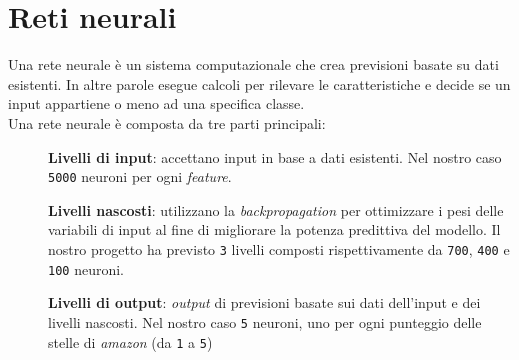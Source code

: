 				
		\section{Reti neurali}
			Una rete neurale è un sistema computazionale che crea previsioni basate su dati esistenti. In altre parole esegue calcoli per rilevare le caratteristiche e decide se un input appartiene o meno ad una specifica classe.\\			
			Una rete neurale è composta da tre parti principali:
			\begin{description}
				\item[] \textbf{Livelli di input}: accettano input in base a dati esistenti. Nel nostro caso \verb|5000| neuroni per ogni \textit{feature}.
				\item[] \textbf{Livelli nascosti}: utilizzano la \textit{backpropagation} per ottimizzare i pesi delle variabili di input al fine di migliorare la potenza predittiva del modello. Il nostro progetto ha previsto \verb|3| livelli composti rispettivamente da \verb|700|, \verb|400| e \verb|100| neuroni.
				\item[] \textbf{Livelli di output}: \textit{output} di previsioni basate sui dati dell'input e dei livelli nascosti. Nel nostro caso \verb|5| neuroni, uno per ogni punteggio delle stelle di \textit{amazon} (da \verb|1| a \verb|5|)
			\end{description}
				
	
	
